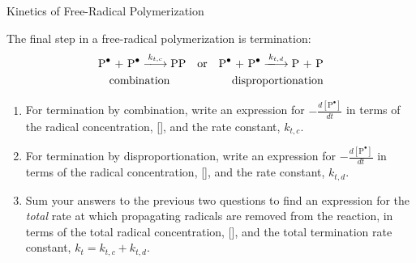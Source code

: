 \begin{activity}{Kinetics of Free-Radical Polymerization}
\begin{ctqs}
	\question The final step in a free-radical polymerization is termination:
		\begin{align*}
			\text{\ce{P^.} + \ce{P^.}} \xlongrightarrow{k_{t,c}} \text{\ce{PP}} && \text{or} && \text{\ce{P^.} + \ce{P^.}} \xlongrightarrow{k_{t,d}} \text{P + P}\\
			\text{combination\hspace{0.5cm}} && && \text{disproportionation}
		\end{align*}
		
		\begin{enumerate}
			\item For termination by combination, write an expression for $-\frac{d[\text{P}^{\bullet}]}{dt}$ in terms of the radical concentration, [], and the rate constant, $k_{t,c}$.
			
				\begin{solution}[0.75in]\end{solution}
			
			\item For termination by disproportionation, write an expression for $-\frac{d[\text{P}^{\bullet}]}{dt}$ in terms of the radical concentration, [], and the rate constant, $k_{t,d}$.
			
				\begin{solution}[0.75in]\end{solution}
			
			\item Sum your answers to the previous two questions to find an expression for the \emph{total} rate at which propagating radicals are removed from the reaction, in terms of the total radical concentration, [], and the total termination rate constant, $k_t = k_{t,c} + k_{t,d}$.
			
				\begin{solution}[0.75in]\end{solution}
				

\end{enumerate}
\end{ctqs}
\end{activity}

